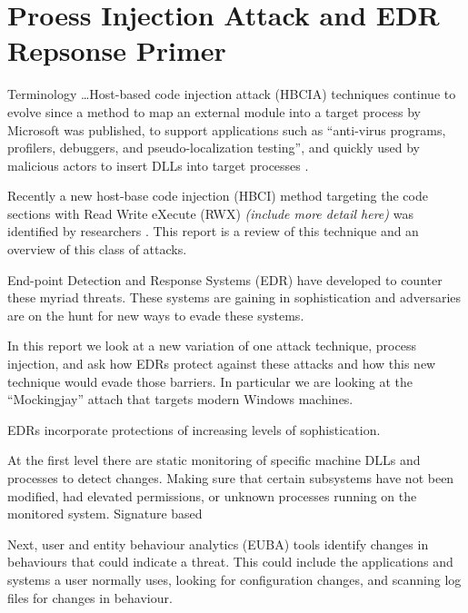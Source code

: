 




\section{Proess Injection Attack and EDR Repsonse Primer}


Terminology \ldots Host-based code injection attack (HBCIA) techniques \autocite{Barabosch:2014} continue to evolve since a method to map an external module into a target process by Microsoft \autocite{Ghizzoni:2004} was published, to support applications such as ``anti-virus programs, profilers, debuggers, and pseudo-localization testing'', and quickly used by malicious actors to insert DLLs into target processes \autocite{Jang:2007}.

Recently a new host-base code injection (HBCI) method targeting the code sections with Read Write eXecute (RWX)  \textit{(include more detail here)} was identified by researchers \autocite{Peixoto:2023}.  This report is a review of this technique and an overview of this class of attacks.


End-point Detection and Response Systems (EDR) have developed to counter these myriad threats.  These systems are gaining in sophistication and adversaries
are on the hunt for new ways to evade these systems.

In this report we look at a new variation of one attack technique, process injection, and ask how EDRs protect against these attacks and how
this new technique would evade those barriers.  In particular we are looking at the ``Mockingjay'' attach that targets modern Windows machines.

EDRs incorporate protections of increasing levels of sophistication.

At the first level there are static monitoring of specific machine DLLs and processes to detect changes.  Making sure that certain subsystems
have not been modified, had elevated permissions, or unknown processes running on the monitored system.  Signature based

Next, user and entity behaviour analytics (EUBA) tools identify changes in behaviours that could indicate a threat.  This could include the
applications and systems a user normally uses, looking for configuration changes, and scanning log files for changes in behaviour.


